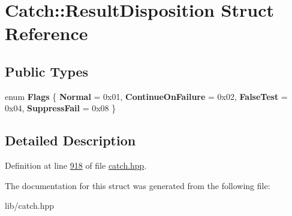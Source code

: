 \hypertarget{structCatch_1_1ResultDisposition}{}\section{Catch\+::Result\+Disposition Struct Reference}
\label{structCatch_1_1ResultDisposition}
\subsection*{Public Types}
\begin{DoxyCompactItemize}
\item 
\mbox{\label{structCatch_1_1ResultDisposition_a3396cad6e2259af326b3aae93e23e9d8}} 
enum {\bfseries Flags} \{ {\bfseries Normal} = 0x01, 
{\bfseries Continue\+On\+Failure} = 0x02, 
{\bfseries False\+Test} = 0x04, 
{\bfseries Suppress\+Fail} = 0x08
 \}
\end{DoxyCompactItemize}


\subsection{Detailed Description}


Definition at line \mbox{\hyperlink{catch_8hpp_source_l00918}{918}} of file \mbox{\hyperlink{catch_8hpp_source}{catch.\+hpp}}.



The documentation for this struct was generated from the following file\+:\begin{DoxyCompactItemize}
\item 
lib/catch.\+hpp\end{DoxyCompactItemize}
